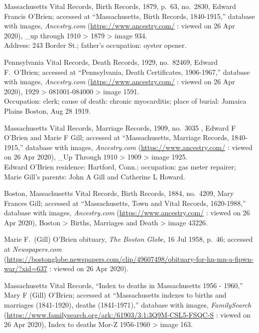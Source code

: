 \begin{thebibliography}{999}
	Massachusetts Vital Records, Birth Records, 1879, p.\ 63, no.\ 2830, Edward Francis O'Brien; accessed at ``Massachusetts, Birth Records, 1840-1915,'' database with images, \textit{Ancestry.com} (\url{https://www.ancestry.com/} : viewed on 26 Apr 2020), \_up through 1910 > 1879 > image 934.\\
	Address: 243 Border St.; father's occupation: oyster opener.
	
	Pennsylvania Vital Records, Death Records, 1929, no.\ 82469, Edward F.\ O'Brien; accessed at ``Pennsylvania, Death Certificates, 1906-1967,'' database with images, \textit{Ancestry.com} (\url{https://www.ancestry.com/} : viewed on 26 Apr 2020), 1929 > 081001-084000 > image 1591.\\
	Occupation: clerk; cause of death: chronic myocarditis; place of burial: Jamaica Plains Boston, Aug 28 1919.
	
	Massachusetts Vital Records, Marriage Records, 1909, no.\ 3035 , Edward F O'Brien and Marie F Gill; accessed at ``Massachusetts, Marriage Records, 1840-1915,'' database with images, \textit{Ancestry.com} (\url{https://www.ancestry.com/} : viewed on 26 Apr 2020), \_Up Through 1910 > 1909 > image 1925.\\
	Edward O'Brien residence: Hartford, Conn.; occupation: gas meter repairer; Marie Gill's parents: John A Gill and Catherine L Howard.
	
	Boston, Massachusetts Vital Records, Birth Records, 1884, no.\ 4209, Mary Frances Gill; accessed at ``Massachusetts, Town and Vital Records, 1620-1988,'' database with images, \textit{Ancestry.com} (\url{https://www.ancestry.com/} : viewed on 26 Apr 2020), Boston > Births, Marriages and Death > image 43226.	
	
	Marie F.\ (Gill) O'Brien obituary, \textit{The Boston Globe}, 16 Jul 1958, p.\ 46; accessed at \textit{Newspapers.com} (\url{https://bostonglobe.newspapers.com/clip/49607498/obituary-for-hn-mn-a-fipwn-war/?xid=637} : viewed on 26 Apr 2020).
	
	Massachusetts Vital Records, ``Index to deaths in Massachusetts 1956 - 1960,'' Mary F (Gill) O'Brien; accessed at ``Massachusetts indexes to births and marriages (1841-1920), deaths (1841-1971),'' database with images, \textit{FamilySearch} (\url{https://www.familysearch.org/ark:/61903/3:1:3Q9M-CSL5-FSQC-S} : viewed on 26 Apr 2020), Index to deaths Mor-Z 1956-1960 > image 163.
	

\end{thebibliography}
